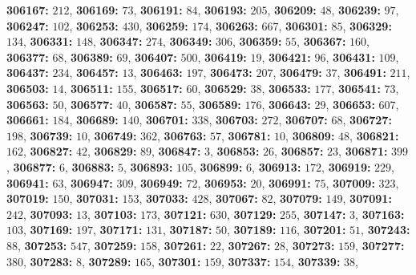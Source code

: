\textsf{\bfseries 306167:} $212$, \textsf{\bfseries 306169:} $73$, \textsf{\bfseries 306191:} $84$, \textsf{\bfseries 306193:} $205$, \textsf{\bfseries 306209:} $48$, \textsf{\bfseries 306239:} $97$, \textsf{\bfseries 306247:} $102$, \textsf{\bfseries 306253:} $430$, \textsf{\bfseries 306259:} $174$, \textsf{\bfseries 306263:} $667$, \textsf{\bfseries 306301:} $85$, \textsf{\bfseries 306329:} $134$, \textsf{\bfseries 306331:} $148$, \textsf{\bfseries 306347:} $274$, \textsf{\bfseries 306349:} $306$, \textsf{\bfseries 306359:} $55$, \textsf{\bfseries 306367:} $160$, \textsf{\bfseries 306377:} $68$, \textsf{\bfseries 306389:} $69$, \textsf{\bfseries 306407:} $500$, \textsf{\bfseries 306419:} $19$, \textsf{\bfseries 306421:} $96$, \textsf{\bfseries 306431:} $109$, \textsf{\bfseries 306437:} $234$, \textsf{\bfseries 306457:} $13$, \textsf{\bfseries 306463:} $197$, \textsf{\bfseries 306473:} $207$, \textsf{\bfseries 306479:} $37$, \textsf{\bfseries 306491:} $211$, \textsf{\bfseries 306503:} $14$, \textsf{\bfseries 306511:} $155$, \textsf{\bfseries 306517:} $60$, \textsf{\bfseries 306529:} $38$, \textsf{\bfseries 306533:} $177$, \textsf{\bfseries 306541:} $73$, \textsf{\bfseries 306563:} $50$, \textsf{\bfseries 306577:} $40$, \textsf{\bfseries 306587:} $55$, \textsf{\bfseries 306589:} $176$, \textsf{\bfseries 306643:} $29$, \textsf{\bfseries 306653:} $607$, \textsf{\bfseries 306661:} $184$, \textsf{\bfseries 306689:} $140$, \textsf{\bfseries 306701:} $338$, \textsf{\bfseries 306703:} $272$, \textsf{\bfseries 306707:} $68$, \textsf{\bfseries 306727:} $198$, \textsf{\bfseries 306739:} $10$, \textsf{\bfseries 306749:} $362$, \textsf{\bfseries 306763:} $57$, \textsf{\bfseries 306781:} $10$, \textsf{\bfseries 306809:} $48$, \textsf{\bfseries 306821:} $162$, \textsf{\bfseries 306827:} $42$, \textsf{\bfseries 306829:} $89$, \textsf{\bfseries 306847:} $3$, \textsf{\bfseries 306853:} $26$, \textsf{\bfseries 306857:} $23$, \textsf{\bfseries 306871:} $399$, \textsf{\bfseries 306877:} $6$, \textsf{\bfseries 306883:} $5$, \textsf{\bfseries 306893:} $105$, \textsf{\bfseries 306899:} $6$, \textsf{\bfseries 306913:} $172$, \textsf{\bfseries 306919:} $229$, \textsf{\bfseries 306941:} $63$, \textsf{\bfseries 306947:} $309$, \textsf{\bfseries 306949:} $72$, \textsf{\bfseries 306953:} $20$, \textsf{\bfseries 306991:} $75$, \textsf{\bfseries 307009:} $323$, \textsf{\bfseries 307019:} $150$, \textsf{\bfseries 307031:} $153$, \textsf{\bfseries 307033:} $428$, \textsf{\bfseries 307067:} $82$, \textsf{\bfseries 307079:} $149$, \textsf{\bfseries 307091:} $242$, \textsf{\bfseries 307093:} $13$, \textsf{\bfseries 307103:} $173$, \textsf{\bfseries 307121:} $630$, \textsf{\bfseries 307129:} $255$, \textsf{\bfseries 307147:} $3$, \textsf{\bfseries 307163:} $103$, \textsf{\bfseries 307169:} $197$, \textsf{\bfseries 307171:} $131$, \textsf{\bfseries 307187:} $50$, \textsf{\bfseries 307189:} $116$, \textsf{\bfseries 307201:} $51$, \textsf{\bfseries 307243:} $88$, \textsf{\bfseries 307253:} $547$, \textsf{\bfseries 307259:} $158$, \textsf{\bfseries 307261:} $22$, \textsf{\bfseries 307267:} $28$, \textsf{\bfseries 307273:} $159$, \textsf{\bfseries 307277:} $380$, \textsf{\bfseries 307283:} $8$, \textsf{\bfseries 307289:} $165$, \textsf{\bfseries 307301:} $159$, \textsf{\bfseries 307337:} $154$, \textsf{\bfseries 307339:} $38$, 
